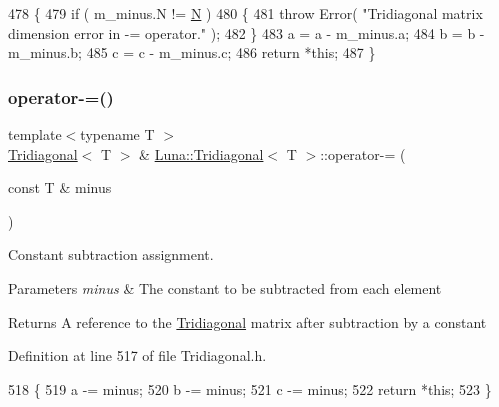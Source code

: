 \begin{DoxyCode}
478   \{
479     \textcolor{keywordflow}{if} ( m\_minus.N != \hyperlink{namespaceHeat__plot_a7d050092798e28458a263710837bda77}{N} )
480     \{
481       \textcolor{keywordflow}{throw} Error( \textcolor{stringliteral}{"Tridiagonal matrix dimension error in -= operator."} );
482     \}
483     a = a - m\_minus.a;
484     b = b - m\_minus.b;
485     c = c - m\_minus.c;
486     \textcolor{keywordflow}{return} *\textcolor{keyword}{this};
487   \}
\end{DoxyCode}
\mbox{\label{classLuna_1_1Tridiagonal_a77da1de7d41e6da4e7b99dc5e571a3a3}} 
\subsubsection{\texorpdfstring{operator-\/=()}{operator-=()}\hspace{0.1cm}{\footnotesize\ttfamily [2/2]}}
{\footnotesize\ttfamily template$<$typename T $>$ \\
\hyperlink{classLuna_1_1Tridiagonal}{Tridiagonal}$<$ T $>$ \& \hyperlink{classLuna_1_1Tridiagonal}{Luna\+::\+Tridiagonal}$<$ T $>$\+::operator-\/= (\begin{DoxyParamCaption}\item[{const T \&}]{minus }\end{DoxyParamCaption})\hspace{0.3cm}{\ttfamily [inline]}}



Constant subtraction assignment. 


\begin{DoxyParams}{Parameters}
{\em minus} & The constant to be subtracted from each element \\
\hline
\end{DoxyParams}
\begin{DoxyReturn}{Returns}
A reference to the \hyperlink{classLuna_1_1Tridiagonal}{Tridiagonal} matrix after subtraction by a constant 
\end{DoxyReturn}


Definition at line 517 of file Tridiagonal.\+h.


\begin{DoxyCode}
518   \{
519     a -= minus;
520     b -= minus;
521     c -= minus;
522     \textcolor{keywordflow}{return} *\textcolor{keyword}{this};
523   \}
\end{DoxyCode}
\mbox{\label{classLuna_1_1Tridiagonal_a3994e79c15f9848a1c1badb19247c1c7}} 
